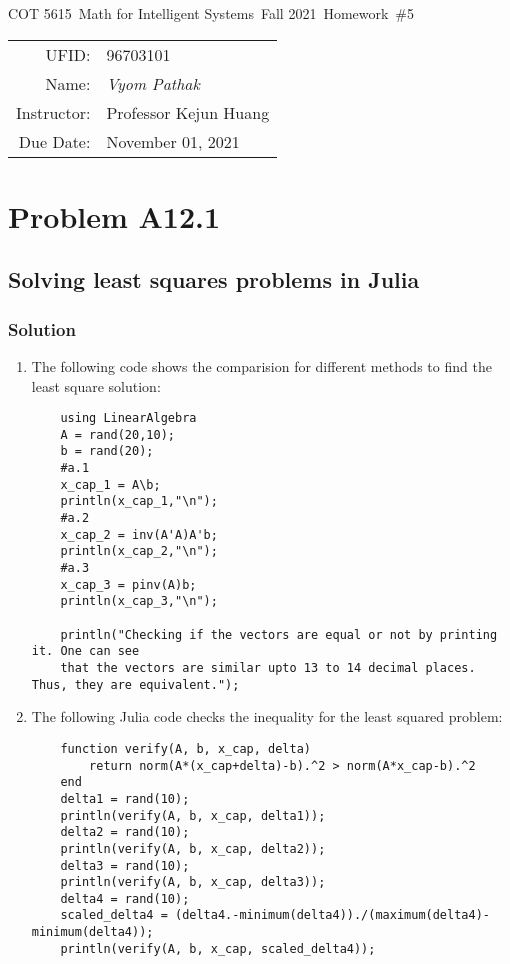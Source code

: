 \documentclass{article}
\newcommand{\hmwkTitle}{Homework\ \#5}
\newcommand{\hmwkDueDate}{November 01, 2021}
\newcommand{\hmwkClassCode}{COT 5615}
\newcommand{\hmwkClass}{Math for Intelligent Systems}
\newcommand{\hmwkClassYear}{Fall 2021}
\newcommand{\hmwkClassInstructor}{Professor Kejun Huang}
\newcommand{\hmwkAuthorName}{\textit{Vyom Pathak}}
\newcommand{\hmwkUFID}{96703101}
\begin{document}
\begin{center}
{\Large \hmwkClassCode\ \hmwkClass\ \hmwkClassYear\ \hmwkTitle}

\begin{tabular}{rl}
UFID: & \hmwkUFID \\
Name: & \hmwkAuthorName \\
Instructor: & \hmwkClassInstructor \\
Due Date: & \hmwkDueDate \\ 
\end{tabular}
\end{center}

\section*{Problem A12.1}
\subsection*{Solving least squares problems in Julia}
\subsubsection*{Solution}
\begin{enumerate}[label=\alph*]
    \item The following code shows the comparision for different methods to find the least square solution:
    \begin{verbatim}
    using LinearAlgebra
    A = rand(20,10);
    b = rand(20);
    #a.1
    x_cap_1 = A\b;
    println(x_cap_1,"\n");
    #a.2
    x_cap_2 = inv(A'A)A'b;
    println(x_cap_2,"\n");
    #a.3
    x_cap_3 = pinv(A)b;
    println(x_cap_3,"\n");
    
    println("Checking if the vectors are equal or not by printing it. One can see 
    that the vectors are similar upto 13 to 14 decimal places. Thus, they are equivalent.");
    \end{verbatim}
    \item The following Julia code checks the inequality for the least squared problem:
    \begin{verbatim}
    function verify(A, b, x_cap, delta)
        return norm(A*(x_cap+delta)-b).^2 > norm(A*x_cap-b).^2
    end
    delta1 = rand(10);
    println(verify(A, b, x_cap, delta1));
    delta2 = rand(10);
    println(verify(A, b, x_cap, delta2));
    delta3 = rand(10);
    println(verify(A, b, x_cap, delta3));
    delta4 = rand(10);
    scaled_delta4 = (delta4.-minimum(delta4))./(maximum(delta4)-minimum(delta4));
    println(verify(A, b, x_cap, scaled_delta4));
    \end{verbatim}
\end{enumerate}
\end{document}
